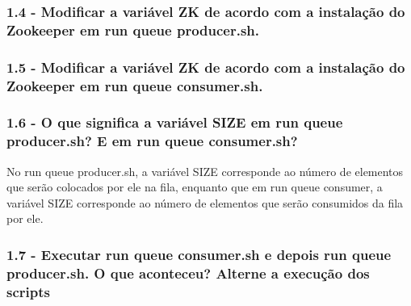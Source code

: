 \subsubsection{1.4 - Modificar a variável ZK de acordo com a instalação do Zookeeper em
run queue producer.sh.}

\vspace{-0.5em}
\begin{minipage}{\textwidth}
  \hspace{-1em}
  \centering
  
  \label{prog1}
  \hspace{1em}
\end{minipage}
\vspace{0.5em}

\subsubsection{1.5 - Modificar a variável ZK de acordo com a instalação do Zookeeper em run queue consumer.sh.}

\vspace{-0.5em}
\begin{minipage}{\textwidth}
  \hspace{-1em}
  \centering
  
  \label{prog1}
  \hspace{1em}
\end{minipage}
\vspace{0.5em}

\subsubsection{1.6 - O que significa a variável SIZE em run queue producer.sh? E em
run queue consumer.sh?}
No run queue producer.sh, a variável SIZE corresponde ao número de elementos que serão colocados por ele na fila, enquanto que em run queue consumer, a variável SIZE corresponde ao número de elementos que serão consumidos da fila por ele.


\subsubsection{1.7 - Executar run queue consumer.sh e depois run queue producer.sh.
O que aconteceu? Alterne a execução dos scripts}

